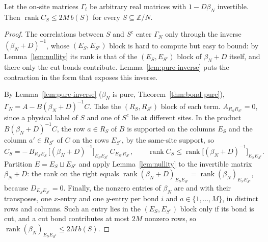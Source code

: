 \begin{theorem}\label{thm:cross-rank}
Let the on-site matrices $\Gamma_i$ be arbitrary real matrices with $1-D\beta_N$ invertible.
Then $\operatorname{rank}C_S\leq2M\,b(S)$ for every $S\subseteq\mathbb Z/N$.
\end{theorem}
\begin{proof}
The correlations between $S$ and $S^c$ enter $\Gamma_N$ only through the inverse
$(\beta_N+D)^{-1}$, whose $(E_S,E_{S^c})$ block is hard to compute but easy to bound: by
Lemma~\ref{lem:nullity} its rank is that of the $(E_S,E_{S^c})$ block of $\beta_N+D$ itself, and
there only the cut bonds contribute. Lemma~\ref{lem:pure-inverse} puts the contraction in the
form that exposes this inverse.

By Lemma~\ref{lem:pure-inverse} ($\beta_N$ is pure, Theorem~\ref{thm:bond-pure}),
$\Gamma_N=A-B(\beta_N+D)^{-1}C$. Take the $(R_S,R_{S^c})$ block of each term.
$A_{R_SR_{S^c}}=0$, since a physical label of $S$ and one of $S^c$ lie at different sites. In the
product $B(\beta_N+D)^{-1}C$, the row $a\in R_S$ of $B$ is supported on the columns $E_S$ and the
column $a'\in R_{S^c}$ of $C$ on the rows $E_{S^c}$, by the same-site support, so
\[
 C_S=-\,B_{R_SE_S}\,\bigl[(\beta_N+D)^{-1}\bigr]_{E_SE_{S^c}}\,C_{E_{S^c}R_{S^c}},\qquad
 \operatorname{rank}C_S\leq\operatorname{rank}\bigl[(\beta_N+D)^{-1}\bigr]_{E_SE_{S^c}} .
\]
Partition $E=E_S\sqcup E_{S^c}$ and apply Lemma~\ref{lem:nullity} to the invertible matrix
$\beta_N+D$: the rank on the right equals $\operatorname{rank}(\beta_N+D)_{E_SE_{S^c}}
=\operatorname{rank}(\beta_N)_{E_SE_{S^c}}$, because $D_{E_SE_{S^c}}=0$. Finally, the nonzero
entries of $\beta_N$ are  and
 with their transposes, one $x$-entry and one $y$-entry per
bond $i$ and $a\in\{1,\ldots,M\}$, in distinct rows and columns. Such an entry lies in the
$(E_S,E_{S^c})$ block only if its bond is cut, and a cut bond contributes at most $2M$ nonzero
rows, so $\operatorname{rank}(\beta_N)_{E_SE_{S^c}}\leq2M\,b(S)$.
\end{proof}

